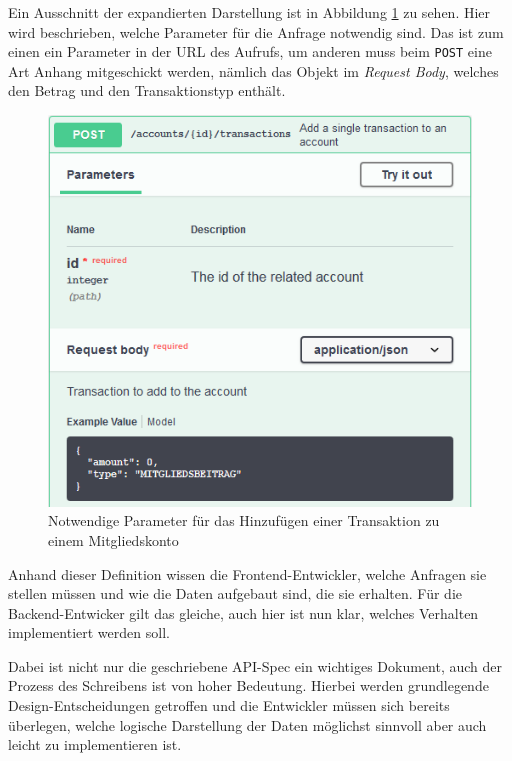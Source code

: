 \documentclass[a4paper, 11pt]{article}
\begin{document}
Ein Ausschnitt der expandierten Darstellung ist in Abbildung
\ref{fig:api_spec_post} zu sehen. Hier wird beschrieben, welche Parameter für
die Anfrage notwendig sind. Das ist zum einen ein Parameter in der URL des
Aufrufs, um anderen muss beim \texttt{POST} eine Art Anhang mitgeschickt
werden, nämlich das Objekt im \emph{Request Body}, welches den Betrag und den
Transaktionstyp enthält.

\begin{figure}[htpb]
    \centering
    \includegraphics[width=\textwidth]{images/api_spec_example_post.png}
    \caption{Notwendige Parameter für das Hinzufügen einer Transaktion zu einem
    Mitgliedskonto}
    \label{fig:api_spec_post}
\end{figure}

Anhand dieser Definition wissen die Frontend-Entwickler, welche Anfragen sie
stellen müssen und wie die Daten aufgebaut sind, die sie erhalten. Für die
Backend-Entwicker gilt das gleiche, auch hier ist nun klar, welches Verhalten
implementiert werden soll.

Dabei ist nicht nur die geschriebene API-Spec ein wichtiges Dokument, auch der
Prozess des Schreibens ist von hoher Bedeutung. Hierbei werden grundlegende
Design-Entscheidungen getroffen und die Entwickler müssen sich bereits
überlegen, welche logische Darstellung der Daten möglichst sinnvoll aber auch
leicht zu implementieren ist.
\end{document}
